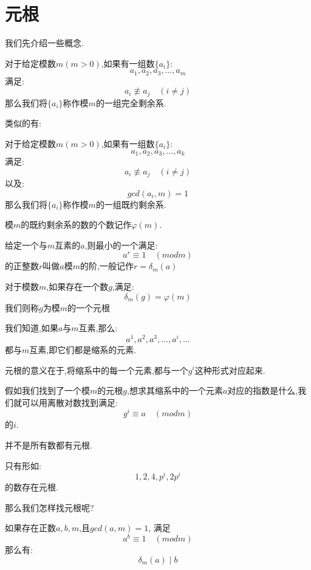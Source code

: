 \documentclass{beamer}
\begin{document}
	\section{元根}
		\begin{frame}
			我们先介绍一些概念.
			\begin{definition}[剩余系]
				对于给定模数$m(m > 0)$,如果有一组数$\{ a_i\}$:
				$$
					a_1, a_2, a_3,\dots, a_{m}
				$$
				满足:
				$$
				a_i \not \equiv a_j \quad (i \neq j)
				$$
				那么我们将$\{a_i\}$称作模$m$的一组完全剩余系.
			\end{definition}
			
		\end{frame}
		\begin{frame}
			类似的有:
			\begin{definition}[既约剩余系]
				对于给定模数$m(m > 0)$,如果有一组数$\{ a_i\}$:
				$$
					a_1, a_2, a_3,\dots, a_{k}
				$$
				满足:
				$$
					a_i \not \equiv a_j \quad (i \neq j)
				$$
				以及:
				$$
					gcd(a_i,m) = 1
				$$
				那么我们将$\{a_i\}$称作模$m$的一组既约剩余系.
			\end{definition}
			模$m$的既约剩余系的数的个数记作$\varphi(m)$.
		\end{frame}
		\begin{frame}
			\begin{definition}[阶]
				给定一个与$m$互素的$a$,则最小的一个满足:
				$$
					a^r \equiv 1 \quad (mod m)
				$$
				的正整数$r$叫做$a$模$m$的阶,一般记作$r = \delta_m(a)$
			\end{definition}
			\begin{definition}[元根] 
				对于模数$m$,如果存在一个数$g$,满足:
				$$
					\delta_m(g) = \varphi(m)
				$$
				我们则称$g$为模$m$的一个元根
			\end{definition}
		\end{frame}
		\begin{frame}
			我们知道,如果$a$与$m$互素,那么:
			$$
				a^1, a^2, a^3,\dots,a^i,\dots
			$$
			都与$m$互素,即它们都是缩系的元素.
			
			元根的意义在于,将缩系中的每一个元素,都与一个$g^i$这种形式对应起来.
			
			假如我们找到了一个模$m$的元根$g$,想求其缩系中的一个元素$a$对应的指数是什么,我们就可以用离散对数找到满足:
			$$
				g^i \equiv a \quad (mod m)
			$$
			的$i$.
		\end{frame}
		\begin{frame}
			并不是所有数都有元根.
			\begin{theorem}
				只有形如:
				$$
				1,2,4,p^i,2p^i
				$$
				的数存在元根.
			\end{theorem}
			
			那么我们怎样找元根呢?
			
			\begin{theorem}
				如果存在正数$a,b,m$,且$gcd(a,m) = 1$, 满足
				$$
				a^b \equiv 1 \quad (mod m)
				$$
				那么有:
				$$
				\delta_m(a) \mid b
				$$
			\end{theorem}
			
		\end{frame}
\end{document}
